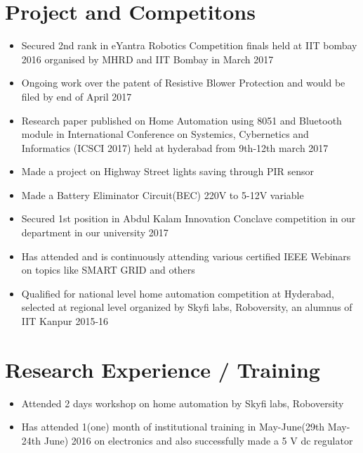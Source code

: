 \documentclass[]{article}
\begin{document}
\section{Project and Competitons }
\begin{itemize}
\item Secured 2nd rank in eYantra Robotics Competition finals held at IIT bombay 2016 organised by MHRD and IIT Bombay in March 2017
\item Ongoing work over the patent of Resistive Blower Protection and would be filed by end of April 2017
\item Research paper published on Home Automation using 8051 and Bluetooth module in International Conference on Systemics, Cybernetics and Informatics (ICSCI 2017) held at hyderabad from 9th-12th march 2017 
\item Made a project on Highway Street lights saving through PIR sensor 
\item Made a Battery Eliminator Circuit(BEC) 220V to 5-12V variable
\item Secured 1st position in Abdul Kalam Innovation Conclave competition in our department in our university 2017
\item Has attended and is continuously attending various certified IEEE Webinars on topics like SMART GRID and others
\item Qualified for national level home automation competition at Hyderabad, selected at regional level organized by Skyfi labs, Roboversity, an alumnus of IIT Kanpur 2015-16 
\end{itemize}

\pagebreak

\section{Research Experience / Training }
\begin{itemize}
\item Attended 2 days workshop on home automation by Skyfi labs, Roboversity
\item Has attended 1(one) month of institutional training in May-June(29th May-24th June) 2016 on electronics and also successfully made a 5 V dc regulator
\end{itemize}
\end{document}
